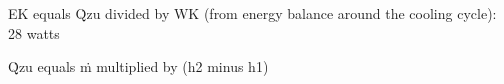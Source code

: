 EK equals Q̇zu divided by WK (from energy balance around the cooling cycle):  
28 watts  

Q̇zu equals ṁ multiplied by (h2 minus h1)